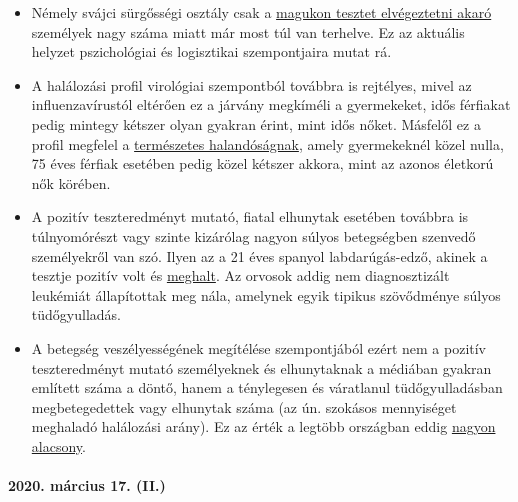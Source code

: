 \begin{itemize}
\tightlist
\item
  Némely svájci sürgősségi osztály csak a
  \href{https://insideparadeplatz.ch/2020/03/16/notfall-stationen-bereits-seit-tagen-am-anschlag/}{magukon
  tesztet elvégeztetni akaró} személyek nagy száma miatt már most túl
  van terhelve. Ez az aktuális helyzet pszichológiai és logisztikai
  szempontjaira mutat rá.
\item
  A halálozási profil virológiai szempontból továbbra is rejtélyes,
  mivel az influenzavírustól eltérően ez a járvány megkíméli a
  gyermekeket, idős férfiakat pedig mintegy kétszer olyan gyakran érint,
  mint idős nőket. Másfelől ez a profil megfelel a
  \href{http://www.gbe-bund.de/gbe10/abrechnung.prc_abr_test_logon?p_uid=gast\&p_aid=0\&p_knoten=FID\&p_sprache=D\&p_suchstring=820}{természetes
  halandóságnak}, amely gyermekeknél közel nulla, 75 éves férfiak
  esetében pedig közel kétszer akkora, mint az azonos életkorú nők
  körében.
\item
  A pozitív teszteredményt mutató, fiatal elhunytak esetében továbbra is
  túlnyomórészt vagy szinte kizárólag nagyon súlyos betegségben szenvedő
  személyekről van szó. Ilyen az a 21 éves spanyol labdarúgás-edző,
  akinek a tesztje pozitív volt és
  \href{https://www.msn.com/de-ch/news/other/spanischer-nachwuchs-trainer-stirbt-an-corona/ar-BB11gT64}{meghalt}.
  Az orvosok addig nem diagnosztizált leukémiát állapítottak meg nála,
  amelynek egyik tipikus szövődménye súlyos tüdőgyulladás.
\item
  A betegség veszélyességének megítélése szempontjából ezért nem a
  pozitív teszteredményt mutató személyeknek és elhunytaknak a médiában
  gyakran említett száma a döntő, hanem a ténylegesen és váratlanul
  tüdőgyulladásban megbetegedettek vagy elhunytak száma (az ún. szokásos
  mennyiséget meghaladó halálozási arány). Ez az érték a legtöbb
  országban eddig \href{https://www.euromomo.eu/index.html}{nagyon
  alacsony}.
\end{itemize}

\hypertarget{2020-muxe1rcius-17-ii}{%
\paragraph{2020. március 17. (II.)}\label{2020-muxe1rcius-17-ii}}

